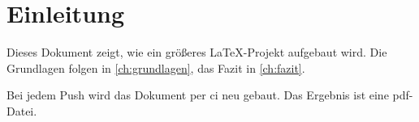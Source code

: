 \chapter{Einleitung}
\label{ch:einleitung}

Dieses Dokument zeigt, wie ein größeres \LaTeX-Projekt aufgebaut wird.
Die Grundlagen folgen in \cref{ch:grundlagen}, das Fazit in \cref{ch:fazit}.

Bei jedem Push wird das Dokument per \gls{ci} neu gebaut.
Das Ergebnis ist eine \gls{pdf}-Datei.

